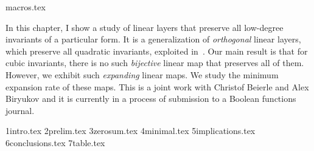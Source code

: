\myminitoc

{macros.tex}

In this chapter, I show a study of linear layers that preserve all low-degree invariants of a particular form. It is a generalization of \emph{orthogonal} linear layers, which preserve all quadratic invariants, exploited in~\cite{NonlinInv}. Our main result is that for cubic invariants, there is no such \emph{bijective} linear map that preserves all of them. However, we exhibit such \emph{expanding} linear maps. We study the minimum expansion rate of these maps. This is a joint work with Christof Beierle and Alex Biryukov and it is currently in a process of submission to a Boolean functions journal.

{1intro.tex}
{2prelim.tex}
{3zerosum.tex}
{4minimal.tex}
{5implications.tex}
{6conclusions.tex}
{7table.tex}
